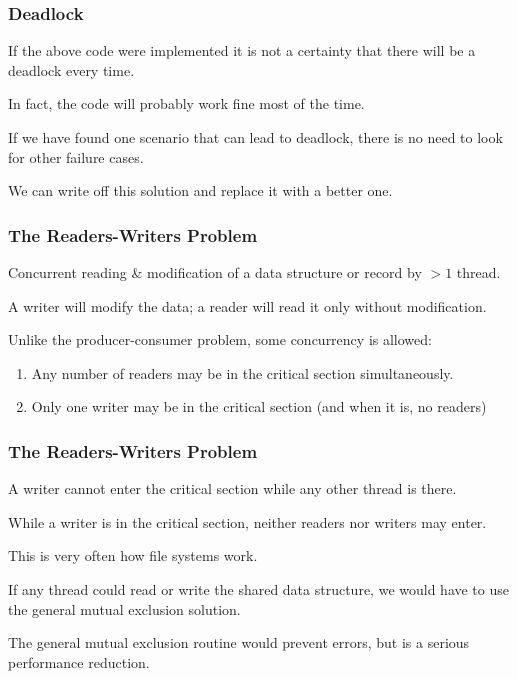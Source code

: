 \begin{frame}
\frametitle{Deadlock}
If the above code were implemented it is not a certainty that there will be a deadlock every time.

 In fact, the code will probably work fine most of the time. 
 
If we have found one scenario that can lead to deadlock, there is no need to look for other failure cases.
 
 We can write off this solution and replace it with a better one.

\end{frame}



\begin{frame}
\frametitle{The Readers-Writers Problem}

Concurrent reading \& modification of a data structure or record by $>1$ thread. 

A writer will modify the data; a reader will read it only without modification. 

Unlike the producer-consumer problem, some concurrency is allowed:

\begin{enumerate}
\item Any number of readers may be in the critical section simultaneously.
\item Only one writer may be in the critical section (and when it is, no readers)
\end{enumerate}


\end{frame}



\begin{frame}
\frametitle{The Readers-Writers Problem}

A writer cannot enter the critical section while any other thread is there. 

While a writer is in the critical section, neither readers nor writers may enter. 

This is very often how file systems work.

If any thread could read or write the shared data structure, we would have to use the general mutual exclusion solution. 

The general mutual exclusion routine would prevent errors, but is a serious performance reduction.

\end{frame}



